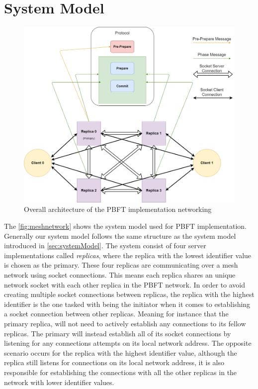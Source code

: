 \section{System Model}
\begin{figure}
	\centering
	\includegraphics[width=\linewidth]{figures/meshnetwork}
	\caption{Overall architecture of the PBFT implementation networking}
	\label{fig:meshnetwork}
\end{figure}
The \autoref{fig:meshnetwork} shows the system model used for PBFT implementation. Generally our system model follows the same structure as the system model introduced in \autoref{sec:systemModel}. The system consist of four server implementations called \emph{replicas}, where the replica with the lowest identifier value is chosen as the primary. These four replicas are communicating over a mesh network using socket connections. This means each replica shares an unique network socket with each other replica in the PBFT network. In order to avoid creating multiple socket connections between replicas, the replica with the highest identifier is the one tasked with being the initiator when it comes to establishing a socket connection between other replicas. Meaning for instance that the primary replica, will not need to actively establish any connections to its fellow replicas. The primary will instead establish all of its socket connections by listening for any connections attempts on its local network address. The opposite scenario occurs for the replica with the highest identifier value, although the replica still listens for connections on its local network address, it is also responsible for establishing the connections with all the other replicas in the network with lower identifier values.

